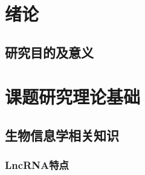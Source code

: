 \section{绪论}
\subsection{研究目的及意义}
\pagebreak

\section{课题研究理论基础}
\subsection{生物信息学相关知识}
\subsubsection{LncRNA特点}